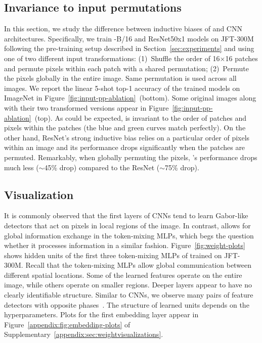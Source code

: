 \subsection{Invariance to input permutations}
In this section, we study the difference between inductive biases of \name{} and CNN architectures.
Specifically, we train \name{}-B/16 and ResNet50x1 models on JFT-300M following the pre-training setup described in Section~\ref{sec:experiments} and using one of two different input transformations:
(1)~Shuffle the order of 16$\times$16 patches and permute pixels within each patch with a shared permutation;
(2)~Permute the pixels globally in the entire image.
Same permutation is used across all images.
We report the linear 5-shot top-1 accuracy of the trained models on ImageNet in Figure~\ref{fig:input-pp-ablation}~(bottom).
Some original images along with their two transformed versions appear in Figure~\ref{fig:input-pp-ablation}~(top).
As could be expected, \name{} is invariant to the order of patches and pixels within the patches (the blue and green curves match perfectly).
On the other hand, ResNet's strong inductive bias relies on a particular order of pixels within an image and its performance drops significantly when the patches are permuted.
Remarkably, when globally permuting the pixels, \name{}'s performance drops much less ($\sim$45\% drop) compared to the ResNet ($\sim$75\% drop).

\subsection{Visualization}
It is commonly observed that the first layers of CNNs tend to learn Gabor-like detectors that act on pixels in local regions of the image.
In contrast, \name{} allows for global information exchange in the token-mixing MLPs, which begs the question whether it processes information in a similar fashion.
Figure~\ref{fig:weight-plots} shows hidden units of the first three token-mixing MLPs of \name{} trained on JFT-300M. 
Recall that the token-mixing MLPs allow global communication between different spatial locations. 
Some of the learned features operate on the entire image, while others operate on smaller regions. 
Deeper layers appear to have no clearly identifiable structure. 
Similar to CNNs, we observe many pairs of 
feature detectors with opposite phases~\cite{shang2016crelu}.
The structure of learned units depends on the hyperparameters.
Plots for the first embedding layer appear in Figure~\ref{appendix:fig:embedding-plots} of Supplementary~\ref{appendix:sec:weightvisualizations}.

